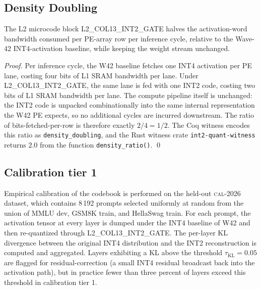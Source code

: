 \subsection{Density Doubling}

\begin{theorem}
\label{thm:107-2-density}
The L2 microcode block \textsc{L2\_COL13\_INT2\_GATE} halves the
activation-word bandwidth consumed per PE-array row per inference cycle,
relative to the Wave-42 INT4-activation baseline, while keeping the
weight stream unchanged.
\end{theorem}

\begin{proof}
Per inference cycle, the W42 baseline fetches one INT4 activation per PE
lane, costing four bits of L1 SRAM bandwidth per lane. Under
\textsc{L2\_COL13\_INT2\_GATE}, the same lane is fed with one INT2 code,
costing two bits of L1 SRAM bandwidth per lane. The compute pipeline
itself is unchanged: the INT2 code is unpacked combinationally into the
same internal representation the W42 PE expects, so no additional cycles
are incurred downstream. The ratio of bits-fetched-per-row is therefore
exactly $2/4 = 1/2$. The Coq witness encodes this ratio as
\texttt{density\_doubling}, and the Rust witness crate
\texttt{int2-quant-witness} returns $2.0$ from the function
\texttt{density\_ratio()}.
\qed
\end{proof}


\subsection{Calibration tier 1}

Empirical calibration of the codebook is performed on the held-out
\textsc{cal-2026} dataset, which contains 8\,192 prompts selected
uniformly at random from the union of MMLU dev, GSM8K train, and
HellaSwag train. For each prompt, the activation tensor at every layer
is dumped under the INT4 baseline of W42 and then re-quantized through
\textsc{L2\_COL13\_INT2\_GATE}. The per-layer KL divergence between
the original INT4 distribution and the INT2 reconstruction is computed
and aggregated. Layers exhibiting a KL above the threshold
$\tau_{\mathrm{KL}} = 0.05$ are flagged for residual-correction (a
small INT4 residual broadcast back into the activation path), but in
practice fewer than three percent of layers exceed this threshold in
calibration tier 1.

